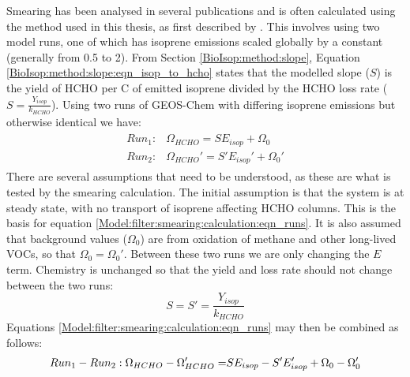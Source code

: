 {      Smearing has been analysed in several publications \parencite[e.g.,][]{Martin2003, Palmer2003, Millet2006, Stavrakou2009, Marais2012, Barkley2013, Zhu2014, Wolfe2016, Surl2018} and is often calculated using the method used in this thesis, as first described by \textcite{Palmer2003}.
      This involves using two model runs, one of which has isoprene emissions scaled globally by a constant (generally from 0.5 to 2).
      From Section \ref{BioIsop:method:slope}, Equation \ref{BioIsop:method:slope:eqn_isop_to_hcho} states that the modelled slope ($S$) is the yield of HCHO per C of emitted isoprene divided by the HCHO loss rate ($S = \frac{Y_{isop}}{k_{HCHO}}$).
      Using two runs of GEOS-Chem with differing isoprene emissions but otherwise identical we have:
      \begin{eqnarray}
      \label{Model:filter:smearing:calculation:eqn_runs}
      \begin{split}
      Run_1 :&  \Omega_{HCHO} = S E_{isop} + \Omega_0 \\
      Run_2 :&  \Omega_{HCHO}' = S' E_{isop}' + \Omega_0' 
      \end{split}
      \end{eqnarray}
      There are several assumptions that need to be understood, as these are what is tested by the smearing calculation.
      The initial assumption is that the system is at steady state, with no transport of isoprene affecting HCHO columns.
      This is the basis for equation \ref{Model:filter:smearing:calculation:eqn_runs}.
      It is also assumed that background values ($\Omega_0$) are from oxidation of methane and other long-lived VOCs, so that $\Omega_0 = \Omega_0'$.
      Between these two runs we are only changing the $E$ term.
      Chemistry is unchanged so that the yield and loss rate should not change between the two runs: 
      \begin{equation}
      S = S' = \frac{Y_{isop}}{k_{HCHO}}
      \end{equation}
      Equations \ref{Model:filter:smearing:calculation:eqn_runs} may then be combined as follows:
      \begin{eqnarray}
      Run_1-Run_2 : \Omega_{HCHO} - \Omega_{HCHO}' = & S E_{isop} - S' E_{isop}' +\Omega_0 - \Omega_0' \notag \\

\end{eqnarray}}

